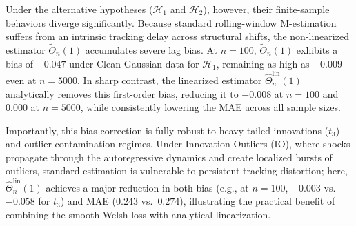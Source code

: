 \documentclass[10pt, a4paper]{article}
\theoremstyle{assumption}
\theoremstyle{definition}
\theoremstyle{theorem}
\begin{document}
Under the alternative hypotheses ($\mathcal{H}_1$ and $\mathcal{H}_2$), however, their finite-sample behaviors diverge significantly. Because standard rolling-window M-estimation suffers from an intrinsic tracking delay across structural shifts, the non-linearized estimator $\widetilde{\Theta}_n(1)$ accumulates severe lag bias. At $n=100$, $\widetilde{\Theta}_n(1)$ exhibits a bias of $-0.047$ under Clean Gaussian data for $\mathcal{H}_1$, remaining as high as $-0.009$ even at $n=5000$. In sharp contrast, the linearized estimator $\widehat{\Theta}_n^{\text{lin}}(1)$ analytically removes this first-order bias, reducing it to $-0.008$ at $n=100$ and $0.000$ at $n=5000$, while consistently lowering the MAE across all sample sizes.

Importantly, this bias correction is fully robust to heavy-tailed innovations ($t_3$) and outlier contamination regimes. Under Innovation Outliers (IO), where shocks propagate through the autoregressive dynamics and create localized bursts of outliers, standard estimation is vulnerable to persistent tracking distortion; here, $\widehat{\Theta}_n^{\text{lin}}(1)$ achieves a major reduction in both bias (e.g., at $n=100$, $-0.003$ vs.\ $-0.058$ for $t_3$) and MAE ($0.243$ vs.\ $0.274$), illustrating the practical benefit of combining the smooth Welsh loss with analytical linearization.
\end{document}

